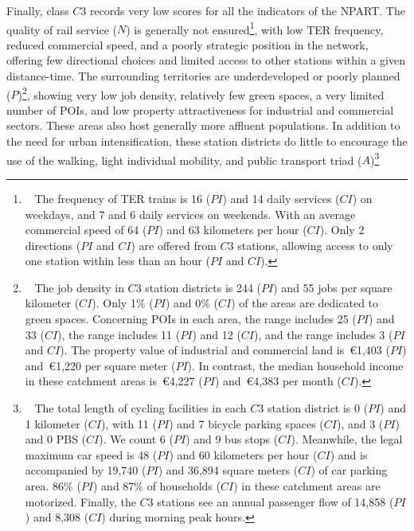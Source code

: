 \begin{refsegment}
Finally, class \(C3\) records very low scores for all the indicators of the \acrshort{NPART}. The quality of rail service (\(N\)) is generally not ensured\footnote{~
    The frequency of \acrshort{TER} trains is 16 (\(PI\)) and 14 daily services (\(CI\)) on weekdays, and 7 and 6 daily services on weekends. With an average commercial speed of 64 (\(PI\)) and 63 kilometers per hour (\(CI\)). Only 2 directions (\(PI\) and \(CI\)) are offered from \(C3\) stations, allowing access to only one station within less than an hour (\(PI\) and \(CI\)).
}, with low \acrshort{TER} frequency, reduced commercial speed, and a poorly strategic position in the network, offering few directional choices and limited access to other stations within a given distance-time. The surrounding territories are underdeveloped or poorly planned (\(P\))\footnote{~
    The job density in \(C3\) station districts is 244 (\(PI\)) and 55 jobs per square kilometer (\(CI\)). Only 1\% (\(PI\)) and 0\% (\(CI\)) of the areas are dedicated to green spaces. Concerning \acrshort{POIs} in each area, the  range includes 25 (\(PI\)) and 33 (\(CI\)), the  range includes 11 (\(PI\)) and 12 (\(CI\)), and the  range includes 3 (\(PI\) and \(CI\)). The property value of industrial and commercial land is~\euro1,403 (\(PI\)) and~\euro1,220 per square meter (\(PI\)). In contrast, the median household income in these catchment areas is~\euro4,227 (\(PI\)) and~\euro4,383 per month (\(CI\)).
}, showing very low job density, relatively few green spaces, a very limited number of \acrshort{POIs}, and low property attractiveness for industrial and commercial sectors. These areas also host generally more affluent populations. In addition to the need for urban intensification, these station districts do little to encourage the use of the walking, light individual mobility, and public transport triad (\(A\))\footnote{~
    The total length of cycling facilities in each \(C3\) station district is 0 (\(PI\)) and 1 kilometer (\(CI\)), with 11 (\(PI\)) and 7 bicycle parking spaces (\(CI\)), and 3 (\(PI\)) and 0 \acrshort{PBS} (\(CI\)). We count 6 (\(PI\)) and 9 bus stops (\(CI\)). Meanwhile, the legal maximum car speed is 48 (\(PI\)) and 60 kilometers per hour (\(CI\)) and is accompanied by 19,740 (\(PI\)) and 36,894 square meters (\(CI\)) of car parking area. 86\% (\(PI\)) and 87\% of households (\(CI\)) in these catchment areas are motorized. Finally, the \(C3\) stations see an annual passenger flow of 14,858 (\(PI\)) and 8,308 (\(CI\)) during morning peak hours.
}
\end{refsegment}
